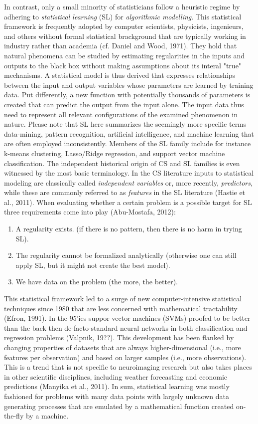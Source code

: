 \documentclass[authoryear,review,3p]{elsarticle}
\begin{document}
In contrast, only a small minority of statisticians
follow a heuristic regime by
adhering to \textit{statistical learning} (SL) for
\textit{algorithmic modelling}.
This statistical framework is frequently adopted by computer scientists,
physicists, ingenieurs, and others without formal statistical brackground
that are typically working in industry
rather than academia (cf. Daniel and Wood, 1971).
%
They hold that natural phenomena
can be studied by estimating regularities in the inputs and
outputs to the black box without making assumptions
about its interal "true" mechanisms.
A statistical model is thus derived that expresses
relationships between the input and output variables
whose parameters are learned by training data.
Put differently, a new function with potentially thousands of
parameters is created
that can predict the output from the input alone.
The input data thus need to represent
all relevant configurations of the examined phenomenon in nature.
%
Please note that SL here summarizes the seemingly more specific terms
data-mining, pattern recognition, artificial intelligence,
and machine learning that are often employed inconsistently.
Members of
the SL family include for instance k-means clustering,
Lasso/Ridge regression, and support vector machine classification.
The independent historical origin of CS and SL families is even
witnessed by the most basic terminology. 
In the CS literature inputs to statistical modeling
are classically called \textit{independent variables}
or, more recently, \textit{predictors},
while these are commonly referred to as \textit{features}
in the SL literature (Hastie et al., 2011).
%
When evaluating whether a certain problem is a possible target for SL
three requirements come into play (Abu-Mostafa, 2012):
\begin{enumerate}
  \item A regularity exists.
(if there is no pattern, then there is no harm in trying SL).
  \item The regularity cannot be formalized analytically
(otherwise one can still apply SL, but it might not create the best model).
  \item We have data on the problem (the more, the better).
\end{enumerate}
%
This statistical framework led to a surge of new
computer-intensive statistical techniques since 1980
that are less concerned with mathematical tractability (Efron, 1991).
In the 95'ies suppor vector machines (SVMs)
proofed to be better than the back then de-facto-standard neural networks
in both classification and regression problems (Valpnik, 19??).
This development has been flanked by changing properties of datasets that
are always higher-dimensional (i.e., more features per observation)
and
based
on larger samples (i.e., more observations).
This is a trend that is not specific to
neuroimaging research but also takes places
in other scientific disciplines,
including weather forecasting and economic predictions
(Manyika et al., 2011).
In sum,
statistical learning was mostly fashioned
for problems with many data points with largely unknown
data generating processes
that are emulated by a mathematical function
created on-the-fly by a machine.
\end{document}
